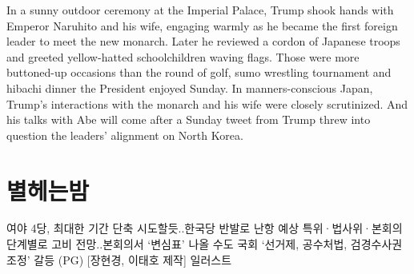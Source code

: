 \documentclass[final,doctor,korean,pdfdoc]{konkukthesis}
\author[korean]{김 혁}
\author[hanja]{金 爀}
\author[english]{KIM, Hyeok}
\begin{document}
\makecontents
  \begin{abstractEng}
In a sunny outdoor ceremony at the Imperial Palace, Trump shook hands with Emperor Naruhito and his wife, engaging warmly as he became the first foreign leader to meet the new monarch. Later he reviewed a cordon of Japanese troops and greeted yellow-hatted schoolchildren waving flags.
Those were more buttoned-up occasions than the round of golf, sumo wrestling tournament and hibachi dinner the President enjoyed Sunday. In manners-conscious Japan, Trump's interactions with the monarch and his wife were closely scrutinized. And his talks with Abe will come after a Sunday tweet from Trump threw into question the leaders' alignment on North Korea.
  \end{abstractEng}
\main
\chapter{별헤는밤 }
여야 4당, 최대한 기간 단축 시도할듯..한국당 반발로 난항 예상
특위·법사위·본회의 단계별로 고비 전망..본회의서 `변심표' 나올 수도
국회 `선거제, 공수처법, 검경수사권 조정' 갈등 (PG) [장현경, 이태호 제작] 일러스트
% 
% 
% 
% 
% 
% 
% 
% 
% 
\end{document}
